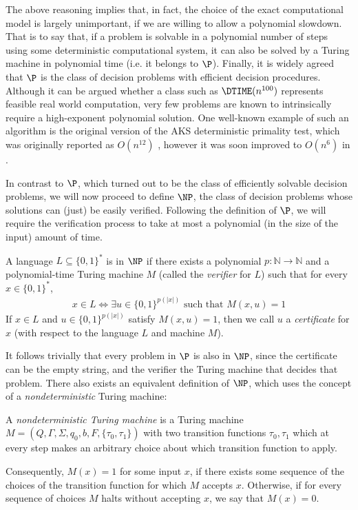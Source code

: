 \documentclass[12pt,a4paper,titlepage,openany]{report}
\begin{document}
The above reasoning implies that, in fact, the choice of the exact computational model is largely unimportant, if we are willing to allow a polynomial slowdown. That is to say that, if a problem is solvable in a polynomial number of steps using some deterministic computational system, it can also be solved by a Turing machine in polynomial time (i.e. it belongs to $\P$). Finally, it is widely agreed that $\P$ is the class of decision problems with efficient decision procedures. Although it can be argued whether a class such as $\DTIME(n^{100})$ represents feasible real world computation, very few problems are known to intrinsically require a high-exponent polynomial solution. One well-known example of such an algorithm is the original version of the AKS deterministic primality test, which was originally reported as $O(n^{12})$ \cite{agrawal2004primes}, however it was soon improved to $O(n^6)$ in \cite{lenstra2002primality}. 

In contrast to $\P$, which turned out to be the class of efficiently solvable decision problems, we will now proceed to define $\NP$, the class of decision problems whose solutions can (just) be easily verified. Following the definition of $\P$, we will require the verification process to take at most a polynomial (in the size of the input) amount of time.

\begin{definition}
	\label{def: First NP definition}
	A language $L \subseteq \{0, 1\}^*$ is in $\NP$ if there exists a polynomial $p : \mathbb N \to \mathbb N$ and a polynomial-time Turing machine $M$ (called the \emph{verifier} for $L$) such that for every $x \in \{0, 1\}^*$,
	\begin{align} 
	x\in L\Leftrightarrow \exists u \in \{0, 1\}^{p(|x|)} \text{ such that } M(x, u) = 1
	\end{align}
	If $x\in L$ and $u \in \{0, 1\}^{p(|x|)}$ satisfy $M(x, u) = 1$, then we call $u$ a \emph{certificate} for $x$ (with respect to the language $L$ and machine $M$).
\end{definition}
It follows trivially that every problem in $\P$ is also in $\NP$, since the certificate can be the empty string, and the verifier the Turing machine that decides that problem. There also exists an equivalent definition of $\NP$, which uses the concept of a \emph{nondeterministic} Turing machine:

\begin{definition}
	A \emph{nondeterministic Turing machine} is a Turing machine $M = ( Q, \Gamma,\allowbreak \Sigma,\allowbreak q_0,\allowbreak b, F, \{\tau_0, \tau_1\})$ with two transition functions $\tau_0, \tau_1$ which at every step makes an arbitrary choice about which transition function to apply. 
	
	Consequently, $M(x)=1$ for some input $x$, if there exists some sequence of the choices of the transition function for which $M$ accepts $x$. Otherwise, if for every sequence of choices $M$ halts without accepting $x$, we say that $M(x) = 0$.
\end{definition}
\end{document}
